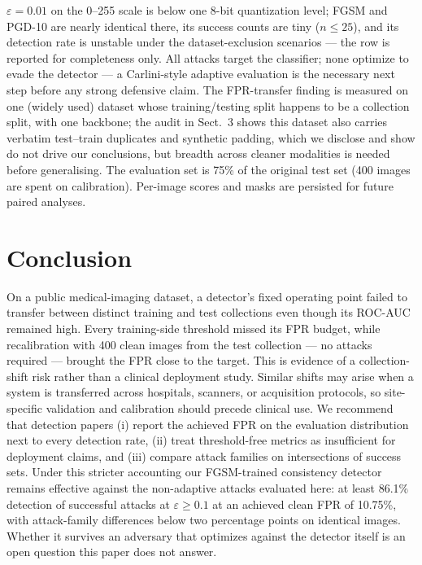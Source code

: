 \documentclass[runningheads]{llncs}
\begin{document}
$\varepsilon=0.01$ on the 0--255 scale is below one 8-bit quantization
level; FGSM and PGD-10 are nearly identical there, its success
counts are tiny ($n \le 25$), and its detection rate is unstable under
the dataset-exclusion scenarios --- the row is reported for completeness
only. All attacks target the classifier; none optimize to evade the
detector --- a Carlini-style adaptive evaluation is the necessary next
step before any strong defensive claim. The FPR-transfer finding is
measured on one (widely used) dataset whose training/testing split
happens to be a collection split, with one backbone; the audit in
Sect.~3 shows this dataset also carries verbatim test--train duplicates
and synthetic padding, which we disclose and show do not drive our
conclusions, but breadth across cleaner modalities is needed before
generalising. The evaluation set is 75\% of the original test set (400
images are spent on calibration). Per-image scores and masks are
persisted for future paired analyses.

\section{Conclusion}

On a public medical-imaging dataset, a detector's fixed operating point
failed to transfer between distinct training and test collections even
though its ROC-AUC remained high. Every training-side threshold missed
its FPR budget, while recalibration with 400 clean images from the test
collection --- no attacks required --- brought the FPR close to the
target. This is evidence of a collection-shift risk rather than a
clinical deployment study. Similar shifts may arise when a system is
transferred across hospitals, scanners, or acquisition protocols, so
site-specific validation and calibration should precede clinical use.
We recommend
that detection papers (i) report the achieved FPR on the evaluation
distribution next to every detection rate, (ii) treat threshold-free
metrics as insufficient for deployment claims, and (iii) compare attack
families on intersections of success sets. Under this stricter
accounting our FGSM-trained consistency detector remains effective
against the non-adaptive attacks evaluated here: at
least 86.1\% detection of successful attacks at $\varepsilon \ge 0.1$
at an achieved clean FPR of 10.75\%, with attack-family differences
below two percentage points on identical images. Whether it survives an adversary that optimizes against the
detector itself is an open question this paper does not answer.



\end{document}
